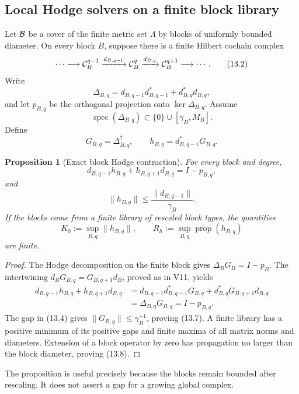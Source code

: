 \documentclass[11pt]{article}
\newtheorem{proposition}[theorem]{Proposition}
\theoremstyle{remark}
\begin{document}
\subsection{Local Hodge solvers on a finite block library}

Let \({\cal B}\) be a cover of the finite metric set \(\Lambda\) by
blocks of uniformly bounded diameter.  On every block \(B\), suppose
there is a finite Hilbert cochain complex
\[
 \cdots\longrightarrow{\cal C}^{q-1}_B
 \xrightarrow{d_{B,q-1}}{\cal C}^{q}_B
 \xrightarrow{d_{B,q}}{\cal C}^{q+1}_B
 \longrightarrow\cdots.                                    \tag{13.2}
\]
Write
\[
 \Delta_{B,q}
 =d_{B,q-1}d_{B,q-1}^*+d_{B,q}^*d_{B,q},                  \tag{13.3}
\]
and let \(p_{B,q}\) be the orthogonal projection onto
\(\ker\Delta_{B,q}\).  Assume
\[
 \operatorname{spec}(\Delta_{B,q})
 \subset\{0\}\cup[\gamma_B,M_B].                            \tag{13.4}
\]
Define
\[
 G_{B,q}=\Delta_{B,q}^\dagger,\qquad
 h_{B,q}=d_{B,q-1}^*G_{B,q}.                               \tag{13.5}
\]

\begin{proposition}[Exact block Hodge contraction]
\label{prop:v12v13-block}
For every block and degree,
\[
 d_{B,q-1}h_{B,q}+h_{B,q+1}d_{B,q}=I-p_{B,q},              \tag{13.6}
\]
and
\[
                  \|h_{B,q}\|
 \le\frac{\|d_{B,q-1}\|}{\gamma_B}.                        \tag{13.7}
\]
If the blocks come from a finite library of rescaled block types,
the quantities
\[
 K_0:=\sup_{B,q}\|h_{B,q}\|,\qquad
 R_h:=\sup_{B,q}\operatorname{prop}(h_{B,q})                \tag{13.8}
\]
are finite.
\end{proposition}

\begin{proof}
The Hodge decomposition on the finite block gives
\(\Delta_BG_B=I-p_B\).  The intertwining
\(d_BG_{B,q}=G_{B,q+1}d_B\), proved as in V11, yields
\[
\begin{split}
 d_{B,q-1}h_{B,q}+h_{B,q+1}d_{B,q}
 &=
 d_{B,q-1}d_{B,q-1}^*G_{B,q}
 +d_{B,q}^*G_{B,q+1}d_{B,q}\\
 &=\Delta_{B,q}G_{B,q}=I-p_{B,q}.
\end{split}
\]
The gap in (13.4) gives
\(\|G_{B,q}\|\le\gamma_B^{-1}\), proving (13.7).  A finite library
has a positive minimum of its positive gaps and finite maxima of all
matrix norms and diameters.  Extension of a block operator by zero
has propagation no larger than the block diameter, proving (13.8).
\end{proof}

The proposition is useful precisely because the blocks remain
bounded after rescaling.  It does not assert a gap for a growing
global complex.
\end{document}
